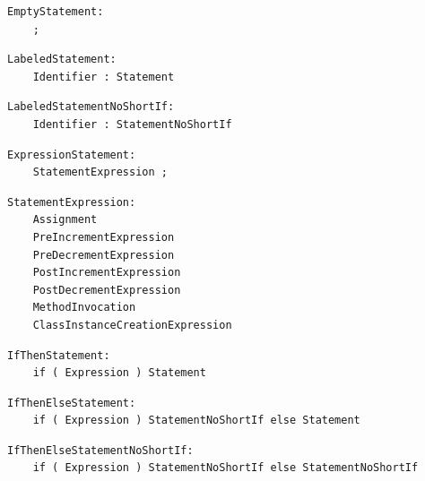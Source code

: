 \noindent\textbf{\texttt{}}\par
\begin{lstlisting}
EmptyStatement:
    ;
\end{lstlisting}

\noindent\textbf{\texttt{}}\par
\begin{lstlisting}
LabeledStatement:
    Identifier : Statement
\end{lstlisting}

\noindent\textbf{\texttt{}}\par
\begin{lstlisting}
LabeledStatementNoShortIf:
    Identifier : StatementNoShortIf
\end{lstlisting}

\noindent\textbf{\texttt{}}\par
\begin{lstlisting}
ExpressionStatement:
    StatementExpression ;
\end{lstlisting}

\noindent\textbf{\texttt{}}\par
\begin{lstlisting}
StatementExpression:
    Assignment
    PreIncrementExpression
    PreDecrementExpression
    PostIncrementExpression
    PostDecrementExpression
    MethodInvocation
    ClassInstanceCreationExpression
\end{lstlisting}

\noindent\textbf{\texttt{}}\par
\begin{lstlisting}
IfThenStatement:
    if ( Expression ) Statement
\end{lstlisting}

\noindent\textbf{\texttt{}}\par
\begin{lstlisting}
IfThenElseStatement:
    if ( Expression ) StatementNoShortIf else Statement
\end{lstlisting}

\noindent\textbf{\texttt{}}\par
\begin{lstlisting}
IfThenElseStatementNoShortIf:
    if ( Expression ) StatementNoShortIf else StatementNoShortIf
\end{lstlisting}

